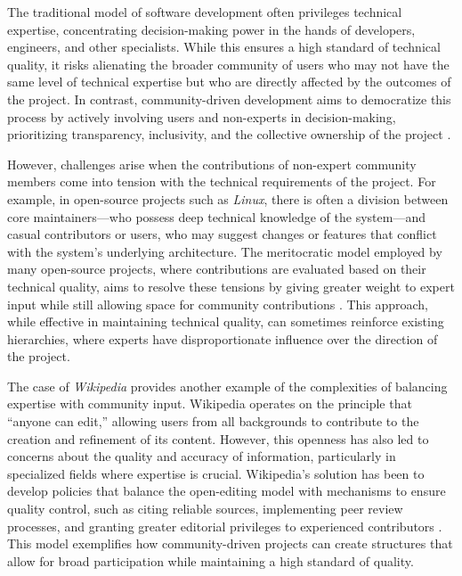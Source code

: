 \begin{refsection}
The traditional model of software development often privileges technical expertise, concentrating decision-making power in the hands of developers, engineers, and other specialists. While this ensures a high standard of technical quality, it risks alienating the broader community of users who may not have the same level of technical expertise but who are directly affected by the outcomes of the project. In contrast, community-driven development aims to democratize this process by actively involving users and non-experts in decision-making, prioritizing transparency, inclusivity, and the collective ownership of the project \cite[pp.~112-115]{mcalevey2021}.

However, challenges arise when the contributions of non-expert community members come into tension with the technical requirements of the project. For example, in open-source projects such as \textit{Linux}, there is often a division between core maintainers—who possess deep technical knowledge of the system—and casual contributors or users, who may suggest changes or features that conflict with the system’s underlying architecture. The meritocratic model employed by many open-source projects, where contributions are evaluated based on their technical quality, aims to resolve these tensions by giving greater weight to expert input while still allowing space for community contributions \cite[pp.~154-157]{schweik2018}. This approach, while effective in maintaining technical quality, can sometimes reinforce existing hierarchies, where experts have disproportionate influence over the direction of the project.

The case of \textit{Wikipedia} provides another example of the complexities of balancing expertise with community input. Wikipedia operates on the principle that “anyone can edit,” allowing users from all backgrounds to contribute to the creation and refinement of its content. However, this openness has also led to concerns about the quality and accuracy of information, particularly in specialized fields where expertise is crucial. Wikipedia’s solution has been to develop policies that balance the open-editing model with mechanisms to ensure quality control, such as citing reliable sources, implementing peer review processes, and granting greater editorial privileges to experienced contributors \cite[pp.~45-47]{ford2013}. This model exemplifies how community-driven projects can create structures that allow for broad participation while maintaining a high standard of quality.


\end{refsection}
